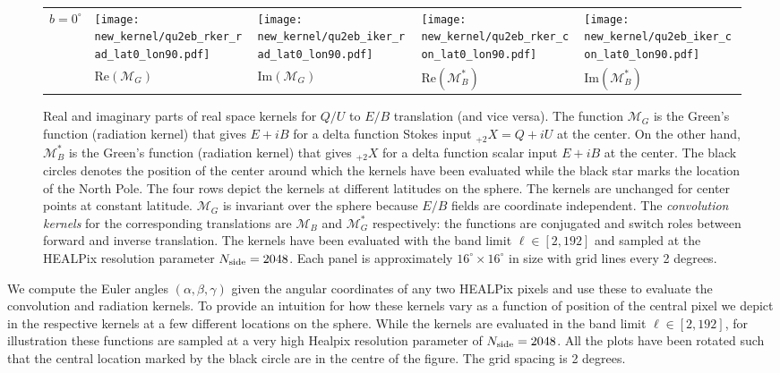 \begin{figure}[t]
\begin{center}
\begin{tabular}{m{8ex}m{}m{}|m{}m{}}
$b=0^\circ$&
\hspace{\kernelfigspace}\texttt{[image: new\_kernel/qu2eb\_rker\_rad\_lat0\_lon90.pdf]} &
\hspace{\kernelfigspace}\texttt{[image: new\_kernel/qu2eb\_iker\_rad\_lat0\_lon90.pdf]} &
\hspace{\kernelfigspace}\texttt{[image: new\_kernel/qu2eb\_rker\_con\_lat0\_lon90.pdf]} &
\hspace{\kernelfigspace}\texttt{[image: new\_kernel/qu2eb\_iker\_con\_lat0\_lon90.pdf]} \\
&
\centering $ \textrm{Re} \left(\mathcal{M}_{G} \right) $ &
\centering $\textrm{Im} \left(\mathcal{M}_{G} \right) $ &
\centering $\textrm{Re}  \left(\mathcal{M}_{B}^* \right) $ &
\centering $\textrm{Im} \left(\mathcal{M}_{B}^* \right) $
\end{tabular}
\end{center}
\caption{Real and imaginary parts of real space kernels for $Q/U$ to $E/B$ translation (and vice versa).  The function $\mathcal{M}_{G}$ is the Green's function (radiation kernel) that gives $E+iB$ for a delta function Stokes input $_{+2}X = Q+iU$ at the center.  On the other hand, $\mathcal{M}^*_{B}$ is the Green's function (radiation kernel) that gives $_{+2}X$ for a delta function scalar input $E+iB$ at the center.  The black circles denotes the position of the center around which the kernels have been evaluated while the black star marks the location of the North Pole. The four rows depict the kernels at different latitudes on the sphere.   The kernels are unchanged for center points at constant latitude.  $\mathcal{M}_G$ is invariant over the sphere because $E/B$ fields are coordinate independent. The \textit{convolution kernels} for the corresponding translations are $\mathcal{M}_B$ and $\mathcal{M}_G^*$ respectively: the functions are conjugated and switch roles between forward and inverse translation. The kernels have been evaluated with the band limit $\ell \in [2,192]$ and sampled at the HEALPix resolution parameter $N_{\rm side}=2048$. Each panel is approximately $16^{\circ} \times 16^{\circ}$ in size with grid lines every 2 degrees. } \label{fig:vis_kernel} 
\end{figure}
%
We compute the Euler angles $(\alpha, \beta, \gamma)$ given the angular coordinates of any two HEALPix pixels and use these to evaluate the convolution and radiation kernels. To provide an intuition for how these kernels vary as a function of position of the central pixel we depict in  the respective kernels at a few different locations on the sphere.
While the kernels are evaluated in the band limit $\ell \in [2,192]$, for illustration these functions are sampled at a very high Healpix resolution parameter of $N_{\rm side}=2048$. All the plots have been rotated such that the central location marked by the black circle are in the centre of the figure. The grid spacing is 2 degrees.

